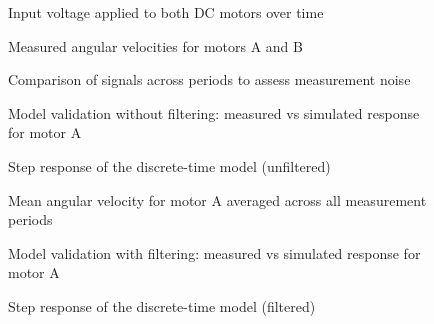 \documentclass{article}
\begin{document}
	\begin{figure}[htbp]
		\centering
		\caption{Input voltage applied to both DC motors over time}
		\label{fig:voltage_time}
	\end{figure}

	\begin{figure}[htbp]
		\centering
		\caption{Measured angular velocities for motors A and B}
		\label{fig:omega_time}
	\end{figure}

	\begin{figure}[htbp]
		\centering
		\caption{Comparison of signals across periods to assess measurement noise}
		\label{fig:noise_analysis}
	\end{figure}

	\begin{figure}[htbp]
		\centering
		\caption{Model validation without filtering: measured vs simulated response for motor A}
		\label{fig:validation_unfiltered}
	\end{figure}

	\begin{figure}[h]
		\centering
		\caption{Step response of the discrete-time model (unfiltered)}
		\label{fig:step_unfiltered}
	\end{figure}

	\begin{figure}[h]
		\centering
		\caption{Mean angular velocity for motor A averaged across all measurement periods}
		\label{fig:omega_mean}
	\end{figure}

	\begin{figure}[h]
		\centering
		\caption{Model validation with filtering: measured vs simulated response for motor A}
		\label{fig:validation_filtered}
	\end{figure}

	\begin{figure}[h]
		\centering
		\caption{Step response of the discrete-time model (filtered)}
		\label{fig:step_filtered}
	\end{figure}
\end{document}
